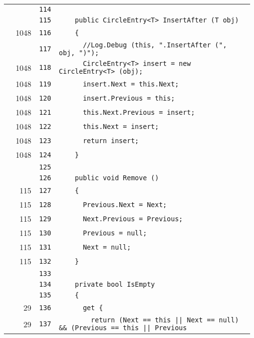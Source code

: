 \documentclass[a4paper,10pt]{article}
\begin{document}
\begin{longtable}[l]{lrrl}
\cellcolor{gray} &  & \verb~114~ & \verb~~\\
\cellcolor{gray} &  & \verb~115~ & \verb~    public CircleEntry<T> InsertAfter (T obj)~\\
\cellcolor{green} & 1048 & \verb~116~ & \verb~    {~\\
\cellcolor{gray} &  & \verb~117~ & \verb~      //Log.Debug (this, ".InsertAfter (", obj, ")");~\\
\cellcolor{green} & 1048 & \verb~118~ & \verb~      CircleEntry<T> insert = new CircleEntry<T> (obj);~\\
\cellcolor{green} & 1048 & \verb~119~ & \verb~      insert.Next = this.Next;~\\
\cellcolor{green} & 1048 & \verb~120~ & \verb~      insert.Previous = this;~\\
\cellcolor{green} & 1048 & \verb~121~ & \verb~      this.Next.Previous = insert;~\\
\cellcolor{green} & 1048 & \verb~122~ & \verb~      this.Next = insert;~\\
\cellcolor{green} & 1048 & \verb~123~ & \verb~      return insert;~\\
\cellcolor{green} & 1048 & \verb~124~ & \verb~    }~\\
\cellcolor{gray} &  & \verb~125~ & \verb~~\\
\cellcolor{gray} &  & \verb~126~ & \verb~    public void Remove ()~\\
\cellcolor{green} & 115 & \verb~127~ & \verb~    {~\\
\cellcolor{green} & 115 & \verb~128~ & \verb~      Previous.Next = Next;~\\
\cellcolor{green} & 115 & \verb~129~ & \verb~      Next.Previous = Previous;~\\
\cellcolor{green} & 115 & \verb~130~ & \verb~      Previous = null;~\\
\cellcolor{green} & 115 & \verb~131~ & \verb~      Next = null;~\\
\cellcolor{green} & 115 & \verb~132~ & \verb~    }~\\
\cellcolor{gray} &  & \verb~133~ & \verb~~\\
\cellcolor{gray} &  & \verb~134~ & \verb~    private bool IsEmpty~\\
\cellcolor{gray} &  & \verb~135~ & \verb~    {~\\
\cellcolor{green} & 29 & \verb~136~ & \verb~      get {~\\
\cellcolor{green} & 29 & \verb~137~ & \verb~        return (Next == this || Next == null) && (Previous == this || Previous~\\

\end{longtable}
\end{document}

